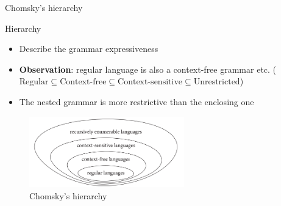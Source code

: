 \documentclass{beamer}
\begin{document}
\begin{frame}{Chomsky's hierarchy}

\begin{block}{Hierarchy}
\begin{itemize}
\item Describe the grammar expressiveness
\item \textbf{Observation}: regular language is also a context-free grammar etc. ($\text{Regular} \subseteq \text{Context-free} \subseteq \text{Context-sensitive} \subseteq \text{Unrestricted}$)
\item The nested grammar is more restrictive than the enclosing one
\end{itemize}
\end{block}


\begin{figure}
\includegraphics[width=0.6\textwidth]{img/chomsky_hierarchy.png}
\caption{\label{fig:chomsky_hierarchy}Chomsky's hierarchy}
\end{figure}

\end{frame}
\end{document}
